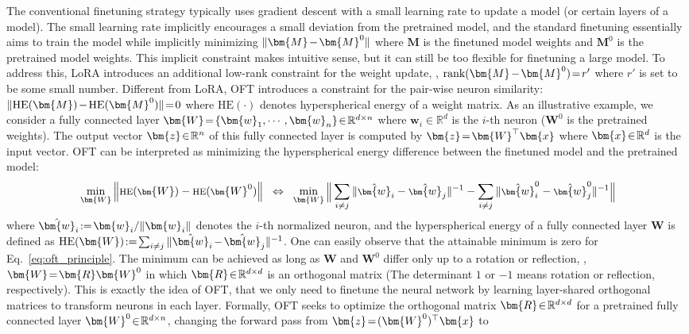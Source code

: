 The conventional finetuning strategy typically uses gradient descent with a small learning rate to update a model (or certain layers of a model). The small learning rate implicitly encourages a small deviation from the pretrained model, and the standard finetuning essentially aims to train the model while implicitly minimizing $\thickmuskip=2mu \medmuskip=2mu \| \bm{M} - \bm{M}^0\|$ where $\bm{M}$ is the finetuned model weights and $\bm{M}^0$ is the pretrained model weights. This implicit constraint makes intuitive sense, but it can still be too flexible for finetuning a large model. To address this, LoRA introduces an additional low-rank constraint for the weight update, \ie, $\thickmuskip=2mu \medmuskip=2mu \text{rank}(\bm{M} - \bm{M}^0)=r'$ where $r'$ is set to be some small number. Different from LoRA, OFT introduces a constraint for the pair-wise neuron similarity: $\thickmuskip=2mu \medmuskip=2mu \| \text{HE}(\bm{M})-\text{HE}(\bm{M}^0) \|=0$ where $\text{HE}(\cdot)$ denotes hyperspherical energy of a weight matrix. As an illustrative example, we consider a fully connected layer $\thickmuskip=2mu \medmuskip=2mu \bm{W}=\{\bm{w}_1,\cdots,\bm{w}_n\}\in\mathbb{R}^{d\times n}$ where $\bm{w}_i\in\mathbb{R}^{d}$ is the $i$-th neuron ($\bm{W}^0$ is the pretrained weights). The output vector $\thickmuskip=2mu \medmuskip=2mu \bm{z}\in\mathbb{R}^n$ of this fully connected layer is computed by $\thickmuskip=2mu \medmuskip=2mu \bm{z}=\bm{W}^\top\bm{x}$ where $\thickmuskip=2mu \medmuskip=2mu \bm{x}\in\mathbb{R}^d$ is the input vector. OFT can be interpreted as minimizing the hyperspherical energy difference between the finetuned model and the pretrained model:
\begin{equation}\label{eq:oft_principle}
\footnotesize
\min_{\bm{W}} \left\| \text{HE}(\bm{W})-\text{HE}(\bm{W}^0)\right\|~~\Leftrightarrow~~\min_{\bm{W}} \bigg{\|} \sum_{i\neq j} \|\hat{\bm{w}}_i-\hat{\bm{w}}_j\|^{-1}-\sum_{i\neq j} \|\hat{\bm{w}}^0_i-\hat{\bm{w}}^0_j\|^{-1}\bigg{\|}
\end{equation}
where $\thickmuskip=2mu \medmuskip=2mu \hat{\bm{w}}_i:=\bm{w}_i/\|\bm{w}_i\|$ denotes the $i$-th normalized neuron, and the hyperspherical energy of a fully connected layer $\bm{W}$ is defined as $\thickmuskip=2mu \medmuskip=2mu \text{HE}(\bm{W}):= \sum_{i\neq j} \|\hat{\bm{w}}_i-\hat{\bm{w}}_j\|^{-1}$. One can easily observe that the attainable minimum is zero for Eq.~\eqref{eq:oft_principle}. The minimum can be achieved as long as $\bm{W}$ and $\bm{W}^0$ differ only up to a rotation or reflection, \ie, $\thickmuskip=2mu \medmuskip=2mu \bm{W}=\bm{R}\bm{W}^0$ in which $\thickmuskip=2mu \medmuskip=2mu \bm{R}\in\mathbb{R}^{d\times d}$ is an orthogonal matrix (The determinant $1$ or $-1$ means rotation or reflection, respectively). This is exactly the idea of OFT, that we only need to finetune the neural network by learning layer-shared orthogonal matrices to transform neurons in each layer. Formally, OFT seeks to optimize the orthogonal matrix $\thickmuskip=2mu \medmuskip=2mu \bm{R}\in\mathbb{R}^{d \times d}$ for a pretrained fully connected layer $\thickmuskip=2mu \medmuskip=2mu\bm{W}^0\in\mathbb{R}^{d\times n}$, changing the forward pass from $\thickmuskip=2mu \medmuskip=2mu\bm{z}=(\bm{W}^0)^\top\bm{x}$ to
